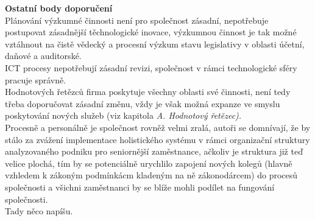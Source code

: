\noindent\textbf{Ostatní body doporučení}\\

Plánování výzkumné činnosti není pro společnost zásadní, nepotřebuje postupovat zásadnější těchnologické inovace, výzkumnou činnost je tak možné vztáhnout na čistě vědecký a procesní výzkum stavu legislativy v oblasti účetní, daňové a auditorské.\\

ICT procesy nepotřebují zásadní revizi, společnost v rámci technologické sféry pracuje správně.\\

Hodnotových řetězců firma poskytuje všechny oblasti své činnosti, není tedy třeba doporučovat zásadní změnu, vždy je však možná expanze ve smyslu poskytování nových služeb (viz kapitola \textit{A. Hodnotový řetězec).}\\

Procesně a personálně je společnost rovněž velmi zralá, autoři se domnívají, že by stálo za zvážení implementace holistického systému v rámci organizační struktury analyzovaného podniku pro seniornější zaměstnance, ačkoliv je struktura již teď velice plochá, tím by se potenciálně urychlilo zapojení nových kolegů (hlavně vzhledem k zákoným podmínkácm kladeným na ně zákonodárcem) do procesů společnosti a všichni zaměstnanci by se blíže mohli podílet na fungování společnosti.\\




Tady něco napíšu.


